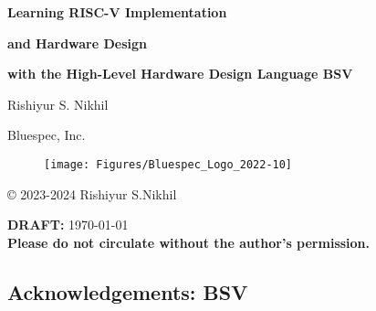 
\pagestyle{empty}

\begin{center}

\vspace*{1.5in}

{\LARGE\bf Learning RISC-V Implementation}

{\LARGE\bf and Hardware Design}

{\LARGE\bf with the High-Level Hardware Design Language BSV}

\vspace{2cm}

{\Large Rishiyur S. Nikhil}

Bluespec, Inc.

\vspace*{0.5in}

\begin{figure}[htbp]
  \centerline{\texttt{[image: Figures/Bluespec\_Logo\_2022-10]}}
\end{figure}

\vfill

\copyright{} 2023-2024 Rishiyur S.Nikhil

\vspace{0.5in}

{\bf DRAFT:} \today \\
{\bf Please do not circulate without the author's permission.}

\end{center}






\vspace*{2in}


% 


\newpage


\vspace*{1.5cm}

\noindent
\subsection*{Acknowledgements: BSV}

